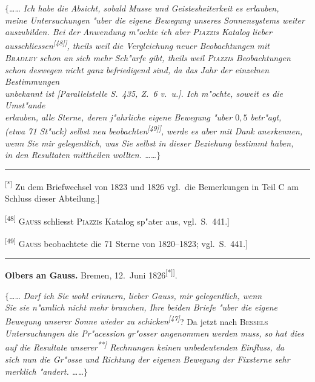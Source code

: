 \documentclass[12pt,a4paper]{article}
\theoremstyle{plain}
\theoremstyle{definition}
\theoremstyle{remark}
\begin{document}
\noindent
$\{$\ldots{}\ldots{} {\itshape Ich habe die Absicht, sobald Musse und Geistesheiterkeit es erlauben,} \\ {\itshape meine Untersuchungen "uber die eigene Bewegung unseres Sonnensystems weiter} \\ {\itshape auszubilden. Bei der Anwendung m"ochte ich aber \textsc{Piazzi}s Katalog lieber} \\ {\itshape ausschliessen\textsuperscript{[48]]}, theils weil die Vergleichung neuer Beobachtungen mit} \\ {\itshape \textsc{Bradley} schon an sich mehr Sch"arfe gibt, theils weil \textsc{Piazzi}s Beobachtungen} \\ {\itshape schon deswegen nicht ganz befriedigend sind, da das Jahr der einzelnen Bestimmungen} \\ {\itshape unbekannt ist [Parallelstelle S.\ 435, Z.\ 6 v.\ u.]. Ich m"ochte, soweit es die Umst"ande} \\ {\itshape erlauben, alle Sterne, deren j"ahrliche eigene Bewegung "uber $0{,}5$ betr"agt,} \\ {\itshape (etwa 71 St"uck) selbst neu beobachten\textsuperscript{[49]]}, werde es aber mit Dank anerkennen,} \\ {\itshape wenn Sie mir gelegentlich, was Sie selbst in dieser Beziehung bestimmt haben,} \\ {\itshape in den Resultaten mittheilen wollten. \ldots{}\ldots{}$\}$}

\rule{\textwidth}{0.4pt}
{\small
\textsuperscript{[*]} Zu dem Briefwechsel von 1823 und 1826 vgl.\ die Bemerkungen in Teil C am Schluss dieser Abteilung.]

\textsuperscript{[48]} \textsc{Gauss} schliesst \textsc{Piazzi}s Katalog sp"ater aus, vgl.\ S.\ 441.]

\textsuperscript{[49]} \textsc{Gauss} beobachtete die 71 Sterne von 1820--1823; vgl.\ S.\ 441.]
}
\rule{\textwidth}{0.4pt}

\vspace{1em}
\begin{center}
\textbf{Olbers an Gauss.} \quad Bremen, 12.\ Juni 1826\textsuperscript{[*]]}.
\end{center}

\noindent
$\{$\ldots{}\ldots{} {\itshape Darf ich Sie wohl erinnern, lieber Gauss, mir gelegentlich, wenn} \\ {\itshape Sie sie n"amlich nicht mehr brauchen, Ihre beiden Briefe "uber die eigene} \\ {\itshape Bewegung unserer Sonne wieder zu schicken\textsuperscript{[47]}}? Da jetzt nach \textsc{Bessels} \\ {\itshape Untersuchungen die Pr"acession gr"osser angenommen werden muss, so hat dies} \\ {\itshape auf die Resultate unserer\textsuperscript{**]} Rechnungen keinen unbedeutenden Einfluss, da} \\ {\itshape sich nun die Gr"osse und Richtung der eigenen Bewegung der Fixsterne sehr} \\ {\itshape merklich "andert. \ldots{}\ldots{}$\}$}
\end{document}
